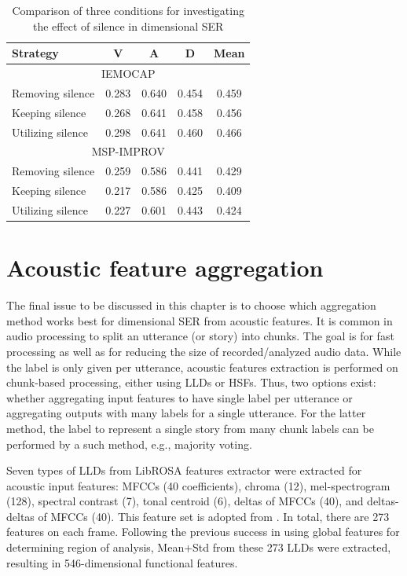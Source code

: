 \begin{table}
  \caption{Comparison of three conditions for investigating the effect of silence in dimensional SER}
  \begin{center}
    \begin{tabular}{l c c c c}
      \hline
Strategy &  V & A & D & Mean \\
\hline \hline
\multicolumn{5}{c}{IEMOCAP} \\
      \hline
Removing silence  & 0.283 & 0.640 & 0.454 & 0.459 \\
Keeping silence & 0.268 & 0.641 & 0.458 & 0.456 \\
Utilizing silence & 0.298 & 0.641 & 0.460 & 0.466 \\
      \hline
\multicolumn{5}{c}{MSP-IMPROV}  \\
      \hline      
Removing silence  & 0.259 & 0.586 & 0.441 & 0.429 \\
Keeping silence & 0.217 & 0.586 & 0.425 & 0.409 \\
Utilizing silence & 0.227 & 0.601 & 0.443 & 0.424 \\
      \hline
    \end{tabular}
  \end{center}
  \label{tab:saf_recap}
\end{table}

\section{Acoustic feature aggregation}
The final issue to be discussed in this chapter is to choose which aggregation
method works best for dimensional SER from acoustic features. It is common in
audio processing to split an utterance (or story) into chunks. The goal is for
fast processing as well as for reducing the size of recorded/analyzed audio
data. While the label is only given per utterance, acoustic features extraction
is performed on chunk-based processing, either using LLDs or HSFs. Thus, two
options exist: whether aggregating input features to have single label per
utterance or aggregating outputs with many labels for a single utterance. For
the latter method, the label to represent a single story from many chunk labels
can be performed by a such method, e.g., majority voting.  

Seven types of LLDs from LibROSA features extractor \cite{McFee2020} were
extracted for acoustic input features: MFCCs (40 coefficients), chroma (12),
mel-spectrogram (128), spectral contrast (7), tonal centroid (6), deltas of
MFCCs (40), and deltas-deltas of MFCCs (40).  This feature set is adopted from
\cite{Atmaja2020j}. In total, there are 273 features on each frame. Following
the previous success in using global features for determining region of
analysis, Mean+Std from these 273 LLDs were extracted, resulting in
546-dimensional functional features.

